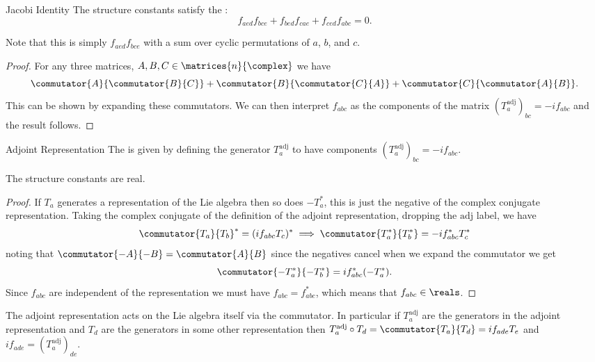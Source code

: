 \begin{thm}{Jacobi Identity}{}
    The structure constants satisfy the :
    \begin{equation}
        f_{aed}f_{bce} + f_{bed}f_{cae} + f_{ced}f_{abc} = 0.
    \end{equation}
    \begin{rmk}
        Note that this is simply \(f_{aed}f_{bce}\) with a sum over cyclic permutations of \(a\), \(b\), and \(c\).
    \end{rmk}
    \begin{proof}
        For any three matrices, \(A, B, C \in \matrices{n}{\complex}\) we have
        \begin{equation}
            \commutator{A}{\commutator{B}{C}} + \commutator{B}{\commutator{C}{A}} + \commutator{C}{\commutator{A}{B}}.
        \end{equation}
        This can be shown by expanding these commutators.
        We can then interpret \(f_{abc}\) as the components of the matrix \((T_a^{\mathrm{adj}})_{bc} = -if_{abc}\) and the result follows.
    \end{proof}
\end{thm}

\begin{dfn}{Adjoint Representation}{}
    The  is given by defining the generator \(T_a^{\mathrm{adj}}\) to have components \((T_a^{\mathrm{adj}})_{bc} = -if_{abc}\).
\end{dfn}

\begin{crl}{}{}
    The structure constants are real.
    \begin{proof}
        If \(T_a\) generates a representation of the Lie algebra then so does \(-T_a^*\), this is just the negative of the complex conjugate representation.
        Taking the complex conjugate of the definition of the adjoint representation, dropping the \(\mathrm{adj}\) label, we have
        \begin{equation}
            \commutator{T_a}{T_b}^* = (if_{abc}T_c)^* \implies \commutator{T_a^*}{T_b^*} = -if_{abc}^*T_c^*
        \end{equation}
        noting that \(\commutator{-A}{-B} = \commutator{A}{B}\) since the negatives cancel when we expand the commutator we get
        \begin{equation}
            \commutator{-T_a^*}{-T_b^*} = if_{abc}^*(-T_a^*).
        \end{equation}
        Since \(f_{abc}\) are independent of the representation we must have \(f_{abc} = f_{abc}^*\), which means that \(f_{abc} \in \reals\).
    \end{proof}
\end{crl}
The adjoint representation acts on the Lie algebra itself via the commutator.
In particular if \(T_a^{\mathrm{adj}}\) are the generators in the adjoint representation and \(T_d\) are the generators in some other representation then \(T_a^{\mathrm{adj}} \circ T_d = \commutator{T_a}{T_d} = if_{ade}T_e\) and \(if_{ade} = (T_a^{\mathrm{adj}})_{de}\).

